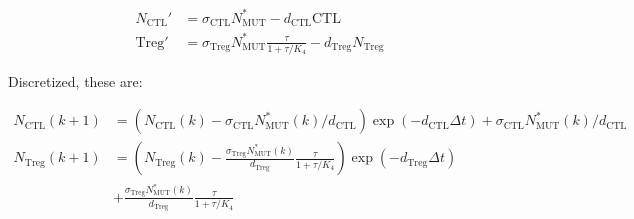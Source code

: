 \documentclass[11pt]{article}
\begin{document}
\begin{equation}\tag{2.9}
\begin{split}
N_\text{CTL}' & = \sigma_{\text{CTL}}N_{\text{MUT}}^* - d_{\text{CTL}}\text{CTL} \\
\text{Treg}' & = \sigma_{\text{Treg}}N_{\text{MUT}}^* \frac{\tau}{1+\tau/K_4}- d_{\text{Treg}}N_\text{Treg}
\end{split}
\end{equation}

Discretized, these are:

\begin{equation}\tag{2.10}
\begin{split}
N_\text{CTL}(k+1) & =  \left (N_\text{CTL}(k)-\sigma_{\text{CTL}}N_{\text{MUT}}^*(k)/d_{\text{CTL}}\right )\exp(- d_{\text{CTL}}\Delta t) + \sigma_{\text{CTL}}N_{\text{MUT}}^*(k)/d_{\text{CTL}}\\
N_\text{Treg}(k+1) & =  \left (N_\text{Treg}(k)-\frac{\sigma_{\text{Treg}}N_{\text{MUT}}^*(k)}{d_{\text{Treg}}} \frac{\tau}{1+\tau/K_4}\right )\exp(-d_{\text{Treg}}\Delta t)\\
&+ \frac{\sigma_{\text{Treg}}N_{\text{MUT}}^*(k)}{d_{\text{Treg}}} \frac{\tau}{1+\tau/K_4}
\end{split}
\end{equation}
\end{document}
